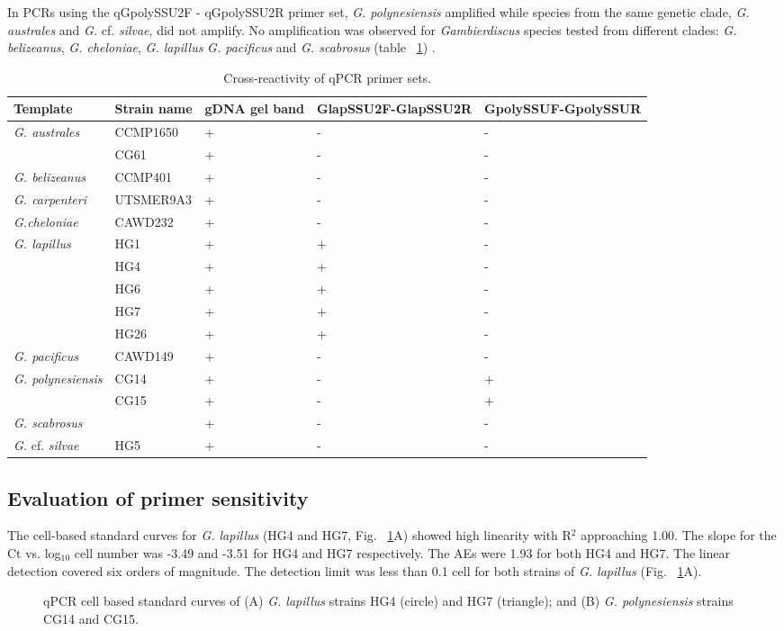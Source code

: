 \documentclass[12pt]{article}
\begin{document}
In PCRs using the qGpolySSU2F - qGpolySSU2R primer set, \emph{G. polynesiensis} amplified while species from the same genetic clade, \emph{G. australes} and \emph{G.} cf. \emph{silvae}, did not amplify. No amplification was observed for \emph{Gambierdiscus} species tested from different clades: \emph{G. belizeanus}, \emph{G. cheloniae}, \emph{G. lapillus }\emph{G. pacificus} and \emph{G. scabrosus} (table ~\ref{tbl:CrossreactTable}) \cite{kretzschmar2016characterization}.


\FloatBarrier
\begin{table}
\caption{Cross-reactivity of qPCR primer sets.}
\label{tbl:CrossreactTable}
\begin{tabular}{ | p{4cm} | p{3cm} | p{2cm} | p{2.5cm} | p{2.5cm} | }
\hline
\textbf{Template} & \textbf{Strain name} & \textbf{gDNA gel band} & \textbf{GlapSSU2F-GlapSSU2R} & \textbf{GpolySSUF-GpolySSUR} \\
\hline
\emph{G. australes} & CCMP1650 &+&-&- \\
\hline
& CG61 &+&-&- \\
\hline
\emph{G. belizeanus}&CCMP401&+&-&-\\
\hline
\emph{G. carpenteri}&UTSMER9A3&+&-&-\\
\hline
\emph{G.cheloniae}&CAWD232&+&-&-\\
\hline
\emph{G. lapillus}&HG1&+&+&-\\
\hline
&HG4&+&+&-\\
\hline
&HG6&+&+&-\\
\hline
&HG7&+&+&-\\
\hline
&HG26&+&+&-\\
\hline
\emph{G. pacificus}&CAWD149&+&-&-\\
\hline
\emph{G. polynesiensis}&CG14&+&-&+\\
\hline
&CG15&+&-&+\\
\hline
\emph{G. scabrosus}&&+&-&-\\
\hline
\emph{G.} cf. \emph{silvae}&HG5&+&-&-\\
\hline
\end{tabular}
\end{table}
\FloatBarrier
 
\subsection*{Evaluation of primer sensitivity}
The cell-based standard curves for \emph{G. lapillus} (HG4 and HG7, Fig. ~\ref{fig:lapiStd}A) showed high linearity with R$^{2}$ approaching 1.00. The slope for the Ct vs. log$_{10}$ cell number was -3.49 and -3.51 for HG4 and HG7 respectively. The AEs were 1.93 for both HG4 and HG7. The linear detection covered six orders of magnitude. The detection limit was less than 0.1 cell for both strains of \emph{G. lapillus} (Fig. ~\ref{fig:lapiStd}A).
\begin{figure}
\caption{qPCR cell based standard curves of (A) \emph{G. lapillus} strains HG4 (circle) and HG7 (triangle); and (B) \emph{G. polynesiensis} strains CG14 and CG15.} %
\label{fig:lapiStd}
\end{figure}
\FloatBarrier
\end{document}
